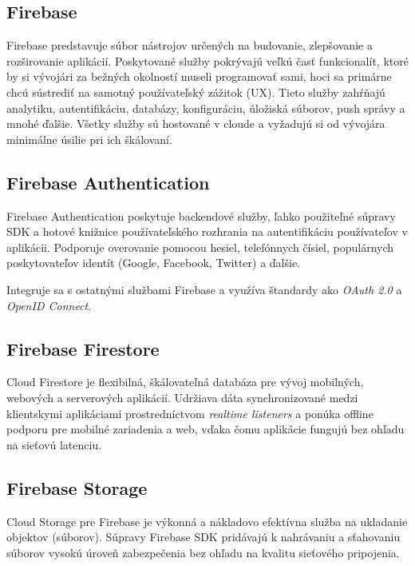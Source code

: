 
\subsection{Firebase}
Firebase predstavuje súbor nástrojov určených na budovanie, zlepšovanie a 
rozširovanie aplikácií. Poskytované služby pokrývajú veľkú časť funkcionalít,
ktoré by si vývojári za bežných okolností museli programovať sami, hoci sa primárne
chcú sústrediť na samotný používateľský zážitok (UX). Tieto služby zahŕňajú analytiku,
autentifikáciu, databázy, konfiguráciu, úložiská súborov, push správy a mnohé ďalšie. 
Všetky služby sú hostované v cloude a vyžadujú si od vývojára minimálne úsilie pri 
ich škálovaní.



\subsection{Firebase Authentication}
Firebase Authentication poskytuje backendové služby, ľahko použiteľné súpravy SDK a hotové knižnice používateľského rozhrania na autentifikáciu používateľov v aplikácii. Podporuje overovanie pomocou hesiel, telefónnych čísiel, populárnych poskytovateľov identít (Google, Facebook, Twitter) a ďalšie.

Integruje sa s ostatnými službami Firebase a využíva štandardy ako \textit{OAuth 2.0} a \textit{OpenID Connect}. 

\subsection{Firebase Firestore}
Cloud Firestore je flexibilná, škálovateľná databáza pre vývoj mobilných, webových a serverových aplikácií. Udržiava dáta synchronizované medzi klientskymi aplikáciami prostredníctvom \textit{realtime listeners} a ponúka offline podporu pre mobilné zariadenia a web, vďaka čomu aplikácie fungujú bez ohľadu na sieťovú latenciu.

\subsection{Firebase Storage}
Cloud Storage pre Firebase je výkonná a nákladovo efektívna služba na ukladanie objektov (súborov). Súpravy Firebase SDK pridávajú k nahrávaniu a sťahovaniu súborov vysokú úroveň zabezpečenia bez ohľadu na kvalitu sieťového pripojenia.
